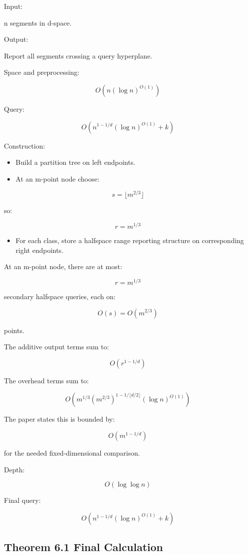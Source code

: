 \documentclass[
  11pt,
]{article}
\providecommand{\tightlist}{%
  \setlength{\itemsep}{0pt}\setlength{\parskip}{0pt}}
\begin{document}
Input:

n segments in d-space.

Output:

Report all segments crossing a query hyperplane.

Space and preprocessing:

\[
O(n(\log n)^{O(1)})
\]

Query:

\[
O(n^{1-1/d}(\log n)^{O(1)}+k)
\]

Construction:

\begin{itemize}
\tightlist
\item
  Build a partition tree on left endpoints.
\item
  At an m-point node choose:
\end{itemize}

\[
s=\lfloor m^{2/3}\rfloor
\]

so:

\[
r=m^{1/3}
\]

\begin{itemize}
\tightlist
\item
  For each class, store a halfspace range reporting structure on
  corresponding right endpoints.
\end{itemize}

At an m-point node, there are at most:

\[
r=m^{1/3}
\]

secondary halfspace queries, each on:

\[
O(s)=O(m^{2/3})
\]

points.

The additive output terms sum to:

\[
O(r^{1-1/d})
\]

The overhead terms sum to:

\[
O\left(m^{1/3}(m^{2/3})^{1-1/\lfloor d/2\rfloor}(\log n)^{O(1)}\right)
\]

The paper states this is bounded by:

\[
O(m^{1-1/d})
\]

for the needed fixed-dimensional comparison.

Depth:

\[
O(\log\log n)
\]

Final query:

\[
O(n^{1-1/d}(\log n)^{O(1)}+k)
\]

\hypertarget{theorem-6.1-final-calculation}{%
\subsection{Theorem 6.1 Final
Calculation}\label{theorem-6.1-final-calculation}}
\end{document}

